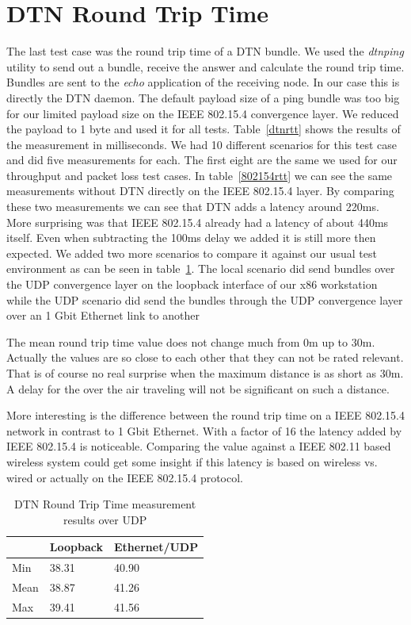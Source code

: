 \section{DTN Round Trip Time}
The last test case was the round trip time of a DTN bundle. We used the
\emph{dtnping} utility to send out a bundle, receive the answer and calculate
the round trip time. Bundles are sent to the \emph{echo} application of the
receiving node. In our case this is directly the DTN daemon. The default payload
size of a ping bundle was too big for our limited payload size on the IEEE
802.15.4 convergence layer. We reduced the payload to 1 byte and used it for all
tests. Table~\ref{dtnrtt} shows the results of the measurement in milliseconds. We
had 10 different scenarios for this test case and did five measurements for each.
The first eight are the same we used for our throughput and packet loss test cases.
In table~\ref{802154rtt} we can see the same measurements without DTN directly on
the IEEE 802.15.4 layer. By comparing these two measurements we can see that DTN
adds a latency around 220ms. More surprising was that IEEE 802.15.4 already had
a latency of about 440ms itself. Even when subtracting the 100ms delay we added
it is still more then expected. We added two more scenarios to compare it against
our usual test environment as can be seen in table~\ref{dtnrtt2}. The
local scenario did send bundles over the UDP convergence layer on the loopback
interface of our x86 workstation while the UDP scenario did send the bundles
through the UDP convergence layer over an 1 Gbit Ethernet link to another

The mean round trip time value does not change much from 0m up to 30m. Actually
the values are so close to each other that they can not be rated relevant. That
is of course no real surprise when the maximum distance is as short as 30m. A
delay for the over the air traveling will not be significant on such a distance.

More interesting is the difference between the round trip time on a IEEE
802.15.4 network in contrast to 1 Gbit Ethernet. With a factor of 16 the latency
added by IEEE 802.15.4 is noticeable. Comparing the value against a
IEEE 802.11 based wireless system could get some insight if this latency is based
on wireless vs. wired or actually on the IEEE 802.15.4 protocol.

\begin{table}
\begin{tabular}{lll}
    & Loopback & Ethernet/UDP \\
\hline
Min & 38.31 & 40.90 \\
Mean & 38.87 & 41.26 \\
Max & 39.41 & 41.56 \\
\end{tabular}
\caption{DTN Round Trip Time measurement results over UDP}
\label{dtnrtt2}
\end{table}
